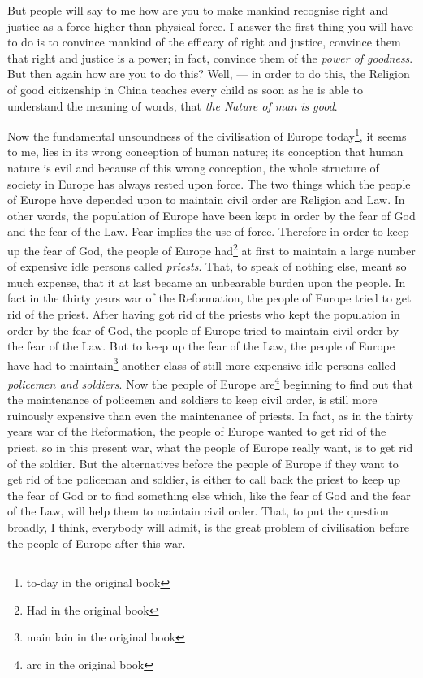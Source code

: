 But people will say to me how are you to make mankind recognise right and justice as a force higher than physical force.
I answer the first thing you will have to do is to convince mankind of the efficacy of right and justice, convince them that right and justice is a power; in fact, convince them of the \emph{power of goodness}.
But then again how are you to do this?
Well, --- in order to do this, the Religion of good citizenship in China teaches every child as soon as he is able to understand the meaning of words, that \emph{the Nature of man is good}\cite{num12}.

Now the fundamental unsoundness of the civilisation of Europe today\footnote{to-day in the original book}, it seems to me, lies in its wrong conception of human nature; its conception that human nature is evil and because of this wrong conception, the whole structure of society in Europe has always rested upon force.
The two things which the people of Europe have depended upon to maintain civil order are Religion and Law.
In other words, the population of Europe have been kept in order by the fear of God and the fear of the Law.
Fear implies the use of force.
Therefore in order to keep up the fear of God, the people of Europe had\footnote{Had in the original book} at first to maintain a large number of expensive idle persons called \emph{priests}.
That, to speak of nothing else, meant so much expense, that it at last became an unbearable burden upon the people.
In fact in the thirty years war of the Reformation,  the people of Europe tried to get rid of the priest.
After having got rid of the priests who kept the population in order by the fear of God, the people of Europe tried to maintain civil order by the fear of the Law.
But to keep up the fear of the Law, the people of Europe have had to maintain\footnote{main lain in the original book} another class of still more expensive idle persons called \emph{policemen and soldiers}.
Now the people of Europe are\footnote{arc in the original book} beginning to find out that the maintenance of policemen and soldiers to keep civil order, is still more ruinously expensive than even the maintenance of priests.
In fact, as in the thirty years war of the Reformation, the people of Europe wanted to get rid of the priest, so in this present war, what the people of Europe really want, is to get rid of the soldier.
But the alternatives before the people of Europe if they want to get rid of the policeman and soldier, is either to call back the priest to keep up the fear of God or to find something else which, like the fear of God and the fear of the Law, will help them to maintain civil order.
That, to put the question broadly, I think, everybody will admit, is the great problem of civilisation before the people of Europe after this war.

